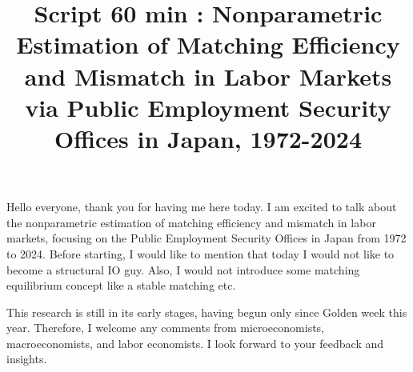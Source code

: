 \documentclass[12pt]{article}
\begin{document}
\title{Script 60 min : Nonparametric Estimation of Matching Efficiency and Mismatch in Labor Markets via Public Employment Security Offices in Japan, 1972-2024}
\maketitle


Hello everyone, thank you for having me here today. I am excited to talk about the nonparametric estimation of matching efficiency and mismatch in labor markets, focusing on the Public Employment Security Offices in Japan from 1972 to 2024. 
Before starting, I would like to mention that today I would not like to become a structural IO guy. 
Also, I would not introduce some matching equilibrium concept like a stable matching etc. 

This research is still in its early stages, having begun only since Golden week this year. Therefore, I welcome any comments from microeconomists, macroeconomists, and labor economists. 
I look forward to your feedback and insights.
\end{document}
